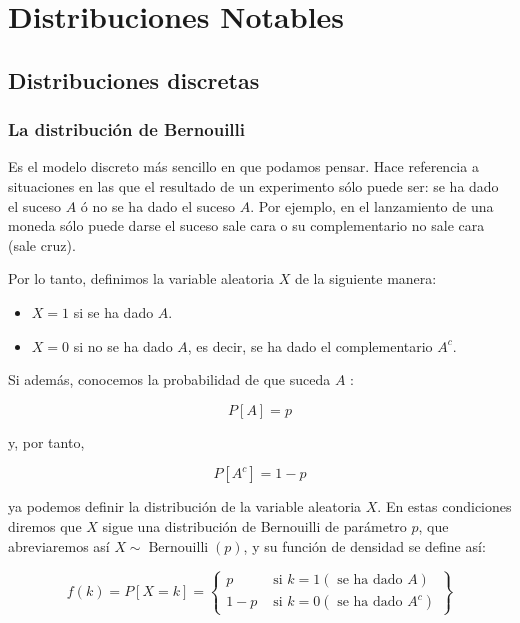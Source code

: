 \documentclass[
]{article}
\providecommand{\tightlist}{%
  \setlength{\itemsep}{0pt}\setlength{\parskip}{0pt}}
\begin{document}
\section{Distribuciones Notables}\label{distribuciones-notables}

\subsection{Distribuciones discretas}\label{distribuciones-discretas}

\subsubsection{La distribución de Bernouilli}\label{la-distribuciuxf3n-de-bernouilli}

Es el modelo discreto más sencillo en que podamos pensar. Hace referencia a situaciones en las que el resultado de un experimento sólo puede ser: se ha dado el suceso \(A\) ó no se ha dado el suceso \(A\). Por ejemplo, en el lanzamiento de una moneda sólo puede darse el suceso sale cara o su complementario no sale cara (sale cruz).

Por lo tanto, definimos la variable aleatoria \(X\) de la siguiente manera:

\begin{itemize}
\tightlist
\item
  \(X=1\) si se ha dado \(A\).
\item
  \(X=0\) si no se ha dado \(A\), es decir, se ha dado el complementario \(A^{c}\).
\end{itemize}

Si además, conocemos la probabilidad de que suceda \(A\) :

\[
P[A]=p
\]

y, por tanto,

\[
P\left[A^{c}\right]=1-p
\]

ya podemos definir la distribución de la variable aleatoria \(X\).
En estas condiciones diremos que \(X\) sigue una distribución de Bernouilli de parámetro \(p\), que abreviaremos así \(X \sim \operatorname{Bernouilli}(p)\), y su función de densidad se define así:

\[
f(k)=P[X=k]=\left\{\begin{array}{cc}
p & \text { si } k=1(\text { se ha dado } A) \\
1-p & \text { si } k=0\left(\text { se ha dado } A^{c}\right)
\end{array}\right\}
\]
\end{document}
